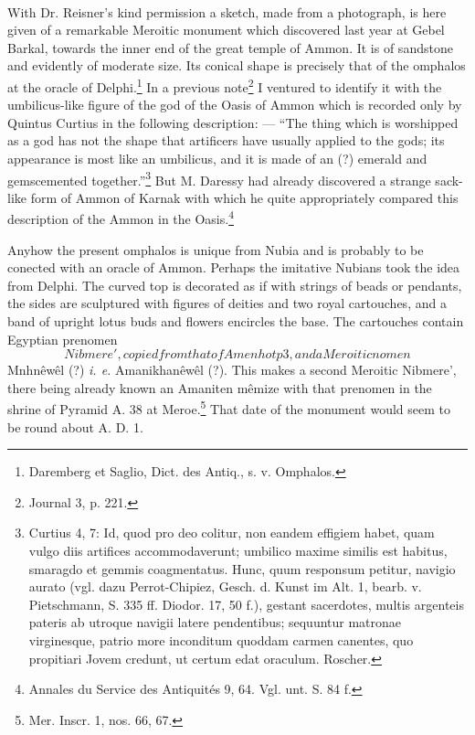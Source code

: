 \documentclass[a4paper, 11pt, oneside]{article}
\newcommand*\svgA{}
\newcommand*\svgB{}
\begin{document}
\paragraph{}
With Dr. Reisner's kind permission a sketch, made from a photograph, is here given of a remarkable Meroitic monument which discovered last year at Gebel Barkal, towards the inner end of the great temple of Ammon. It is of sandstone and evidently of moderate size. Its conical shape is precisely that of the omphalos at the oracle of Delphi.\footnote{Daremberg et Saglio, Dict. des Antiq., s. v. Omphalos.} In a previous note\footnote{Journal 3, p. 221.} I ventured to identify it with the umbilicus-like figure of the god of the Oasis of Ammon which is recorded only by Quintus Curtius in the following description: --- "`The thing which is worshipped as a god has not the shape that artificers have usually applied to the gods; its appearance is most like an umbilicus, and it is made of an (?) emerald and gemscemented together."'\footnote{Curtius 4, 7: Id, quod pro deo colitur, non eandem effigiem habet, quam vulgo diis artifices accommodaverunt; umbilico maxime similis est habitus, smaragdo et gemmis coagmentatus. Hunc, quum responsum petitur, navigio aurato (vgl. dazu Perrot-Chipiez, Gesch. d. Kunst im Alt. 1, bearb. v. Pietschmann, S. 335 ff. Diodor. 17, 50 f.), gestant sacerdotes, multis argenteis pateris ab utroque navigii latere pendentibus; sequuntur matronae virginesque, patrio more inconditum quoddam carmen canentes, quo propitiari Jovem credunt, ut certum edat oraculum. Roscher.} But M. Daressy had already discovered a strange sack-like form of Ammon of Karnak with which he quite appropriately compared this description of the Ammon in the Oasis.\footnote{Annales du Service des Antiquités 9, 64. Vgl. unt. S. 84 f.}

Anyhow the present omphalos is unique from Nubia and is probably to be conected with an oracle of Ammon. Perhaps the imitative Nubians took the idea from Delphi. The curved top is decorated as if with strings of beads or pendants, the sides are sculptured with figures of deities and two royal cartouches, and a band of upright lotus buds and flowers encircles the base. The cartouches contain Egyptian prenomen $\svgA$ Nibmere', copied from that of Amenhotp 3, and a Meroitic nomen $\svgB$ Mnhnêwêl (?) \emph{i. e.} Amanikhanêwêl (?). This makes a second Meroitic Nibmere', there being already known an Amaniten mêmize with that prenomen in the shrine of Pyramid A. 38 at Meroe.\footnote{Mer. Inscr. 1, nos. 66, 67.} That date of the monument would seem to be round about A. D. 1.
\end{document}
